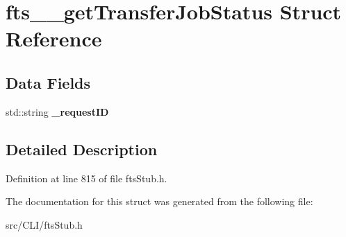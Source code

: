 \section{fts\_\-\_\-getTransferJobStatus Struct Reference}
\label{structfts____getTransferJobStatus}
\subsection*{Data Fields}
\begin{DoxyCompactItemize}
\item 
std::string {\bfseries \_\-requestID}\label{structfts____getTransferJobStatus_a7b46b0970e302d39e6cc9984d2a6c3b9}

\end{DoxyCompactItemize}


\subsection{Detailed Description}


Definition at line 815 of file ftsStub.h.



The documentation for this struct was generated from the following file:\begin{DoxyCompactItemize}
\item 
src/CLI/ftsStub.h\end{DoxyCompactItemize}
